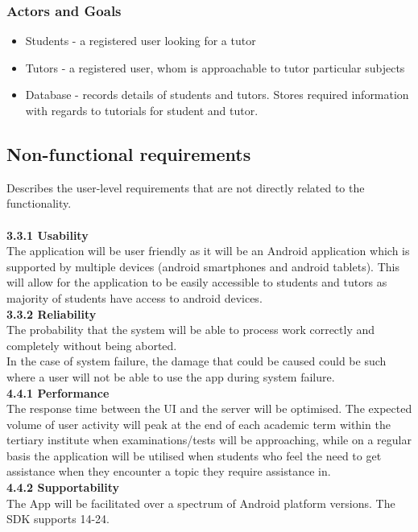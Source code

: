 \documentclass[12pt]{article}
\begin{document}
\subsubsection{Actors and Goals}
\begin{itemize}
\item Students - a registered user looking for a tutor
\item Tutors - a registered user, whom is approachable to tutor particular subjects
\item Database - records details of students and tutors. Stores required information with regards to tutorials for student and tutor.
\end{itemize}

\subsection{Non-functional requirements}{
Describes the user-level requirements that are not directly related to the functionality. \\
\\\textbf{3.3.1 Usability}\\
The application will be user friendly as it will be an Android application which is supported by multiple devices (android smartphones and android tablets). This will allow for the application to be easily accessible to students and tutors as majority of students have access to android devices.
\\\textbf{3.3.2 Reliability}\\
The probability that the system will be able to process work correctly and completely without being aborted.\\
In the case of system failure, the damage that could be caused could be such where a user will not be able to use the app during system failure.
\\\textbf{4.4.1 Performance}\\
The response time between the UI and the server will be optimised. The expected volume of user activity will peak at the end of each academic term within the tertiary institute when examinations/tests will be approaching, while on a regular basis the application will be utilised when students who feel the need to get assistance when they encounter a topic they require assistance in.
\\\textbf{4.4.2 Supportability}\\
The App will be facilitated over a spectrum of Android platform versions. The SDK supports 14-24. \\
}
\end{document}
